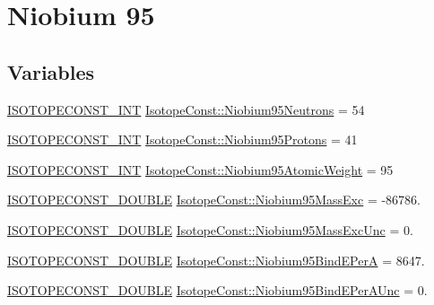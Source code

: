 \hypertarget{group___isotope_const-_niobium-_nb95}{}\section{Niobium 95}
\label{group___isotope_const-_niobium-_nb95}
\subsection*{Variables}
\begin{DoxyCompactItemize}
\item 
\mbox{\hyperlink{group___isotope_const-_macros_ga5f18360b3e99483a35c32d789e62621c}{I\+S\+O\+T\+O\+P\+E\+C\+O\+N\+S\+T\+\_\+\+I\+NT}} \mbox{\hyperlink{group___isotope_const-_niobium-_nb95_ga64d9f8c3d858ce76303d45e38ad350b5}{Isotope\+Const\+::\+Niobium95\+Neutrons}} = 54
\item 
\mbox{\hyperlink{group___isotope_const-_macros_ga5f18360b3e99483a35c32d789e62621c}{I\+S\+O\+T\+O\+P\+E\+C\+O\+N\+S\+T\+\_\+\+I\+NT}} \mbox{\hyperlink{group___isotope_const-_niobium-_nb95_gacec879a71c2dc14598842b3df561af47}{Isotope\+Const\+::\+Niobium95\+Protons}} = 41
\item 
\mbox{\hyperlink{group___isotope_const-_macros_ga5f18360b3e99483a35c32d789e62621c}{I\+S\+O\+T\+O\+P\+E\+C\+O\+N\+S\+T\+\_\+\+I\+NT}} \mbox{\hyperlink{group___isotope_const-_niobium-_nb95_gabce7549abc9a267b4fb9d49ec6405f89}{Isotope\+Const\+::\+Niobium95\+Atomic\+Weight}} = 95
\item 
\mbox{\hyperlink{group___isotope_const-_macros_ga8f45a7272ce02c0b4c65c44636ed719a}{I\+S\+O\+T\+O\+P\+E\+C\+O\+N\+S\+T\+\_\+\+D\+O\+U\+B\+LE}} \mbox{\hyperlink{group___isotope_const-_niobium-_nb95_ga0ec82dfed90aa11b264bf7de20e7dbc0}{Isotope\+Const\+::\+Niobium95\+Mass\+Exc}} = -\/86786.
\item 
\mbox{\hyperlink{group___isotope_const-_macros_ga8f45a7272ce02c0b4c65c44636ed719a}{I\+S\+O\+T\+O\+P\+E\+C\+O\+N\+S\+T\+\_\+\+D\+O\+U\+B\+LE}} \mbox{\hyperlink{group___isotope_const-_niobium-_nb95_ga88b645ccb17e3c88e84bede6dbf0baf0}{Isotope\+Const\+::\+Niobium95\+Mass\+Exc\+Unc}} = 0.
\item 
\mbox{\hyperlink{group___isotope_const-_macros_ga8f45a7272ce02c0b4c65c44636ed719a}{I\+S\+O\+T\+O\+P\+E\+C\+O\+N\+S\+T\+\_\+\+D\+O\+U\+B\+LE}} \mbox{\hyperlink{group___isotope_const-_niobium-_nb95_gae4fb55e2b18cf474f8dd635f1a4fa23f}{Isotope\+Const\+::\+Niobium95\+Bind\+E\+PerA}} = 8647.
\item 
\mbox{\hyperlink{group___isotope_const-_macros_ga8f45a7272ce02c0b4c65c44636ed719a}{I\+S\+O\+T\+O\+P\+E\+C\+O\+N\+S\+T\+\_\+\+D\+O\+U\+B\+LE}} \mbox{\hyperlink{group___isotope_const-_niobium-_nb95_gac23819d9278b4909d22b474b4383a7cb}{Isotope\+Const\+::\+Niobium95\+Bind\+E\+Per\+A\+Unc}} = 0.

\end{DoxyCompactItemize}

